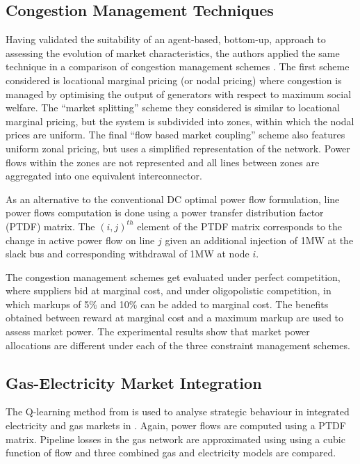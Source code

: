 \subsection{Congestion Management Techniques}
Having validated the suitability of an agent-based, bottom-up, approach to
assessing the evolution of market characteristics, the authors applied the same
technique in a comparison of congestion management schemes \cite{krause:cong}.
The first scheme considered is locational marginal pricing (or nodal
pricing) where congestion is managed by optimising the output of generators
with respect to maximum social welfare.
The ``market splitting'' scheme they considered is similar to locational
marginal pricing, but the system is subdivided into zones, within which the
nodal prices are uniform.  The final ``flow based market coupling'' scheme
also features uniform zonal pricing, but uses a simplified representation
of the network.  Power flows within the zones are not represented and all lines
between zones are aggregated into one equivalent interconnector.

As an alternative to the conventional DC optimal power flow formulation, line
power flows computation is done using a power transfer distribution
factor (PTDF) matrix.  The $(i,j)^{th}$ element of the PTDF matrix corresponds
to the change in active power flow on line $j$ given an additional injection of
1MW at the slack bus and corresponding withdrawal of 1MW at node $i$.

The congestion management schemes get evaluated under perfect competition,
where suppliers bid at marginal cost, and under oligopolistic competition, in
which markups of 5\% and 10\% can be added to marginal cost.  The benefits
obtained between reward at marginal cost and a maximum markup are used to
assess market power.  The experimental results show that market power
allocations are different under each of the three constraint management
schemes.

\subsection{Gas-Electricity Market Integration}
The Q-learning method from  is used to
analyse strategic behaviour in integrated electricity and gas markets in
.  Again, power flows are computed using a PTDF matrix.
Pipeline losses in the gas network are approximated using using a cubic
function of flow and three combined gas and electricity models are
compared.

